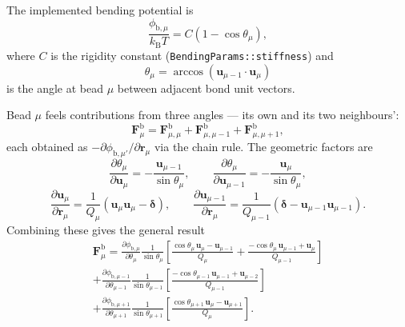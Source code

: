 \documentclass[11pt,a4paper]{report}
\newcommand{\uv}{\bm{u}}
\newcommand{\kB}{k_\mathrm{B}}
\newcommand{\code}[1]{\texttt{\seqsplitcode{#1}}}
\newcommand{\seqsplitcode}[1]{#1}
\begin{document}
The implemented bending potential is
\begin{equation}
  \frac{\phi_{\mathrm{b},\mu}}{\kB T} = C\left(1-\cos\theta_\mu\right),
  \label{eq:bending-potential}
\end{equation}
where $C$ is the rigidity constant (\code{BendingParams::stiffness}) and
\begin{equation}
  \theta_\mu = \arccos\left(\uv_{\mu-1}\cdot\uv_{\mu}\right)
\end{equation}
is the angle at bead $\mu$ between adjacent bond unit vectors.

Bead $\mu$ feels contributions from three angles --- its own and its two
neighbours':
\begin{equation}
  \bm{F}^{\mathrm{b}}_\mu
    = \bm{F}^{\mathrm{b}}_{\mu,\mu}
    + \bm{F}^{\mathrm{b}}_{\mu,\mu-1}
    + \bm{F}^{\mathrm{b}}_{\mu,\mu+1},
\end{equation}
each obtained as $-\partial\phi_{\mathrm{b},\mu'}/\partial\bm{r}_\mu$ via the
chain rule. The geometric factors are
\begin{equation}
  \frac{\partial\theta_\mu}{\partial\uv_\mu} = -\frac{\uv_{\mu-1}}{\sin\theta_\mu},
  \qquad
  \frac{\partial\theta_\mu}{\partial\uv_{\mu-1}} = -\frac{\uv_{\mu}}{\sin\theta_\mu},
\end{equation}
\begin{equation}
  \frac{\partial\uv_\mu}{\partial\bm{r}_\mu} = \frac{1}{Q_\mu}\left(\uv_\mu\uv_\mu-\bm{\delta}\right),
  \qquad
  \frac{\partial\uv_{\mu-1}}{\partial\bm{r}_\mu} = \frac{1}{Q_{\mu-1}}\left(\bm{\delta}-\uv_{\mu-1}\uv_{\mu-1}\right).
\end{equation}
Combining these gives the general result
\begin{multline}
  \bm{F}^{\mathrm{b}}_\mu =
   \frac{\partial\phi_{\mathrm{b},\mu}}{\partial\theta_\mu}\frac{1}{\sin\theta_\mu}
   \left[\frac{\cos\theta_\mu\,\uv_\mu-\uv_{\mu-1}}{Q_\mu}
       + \frac{-\cos\theta_\mu\,\uv_{\mu-1}+\uv_\mu}{Q_{\mu-1}}\right]\\
 + \frac{\partial\phi_{\mathrm{b},\mu-1}}{\partial\theta_{\mu-1}}\frac{1}{\sin\theta_{\mu-1}}
   \left[\frac{-\cos\theta_{\mu-1}\,\uv_{\mu-1}+\uv_{\mu-2}}{Q_{\mu-1}}\right]\\
 + \frac{\partial\phi_{\mathrm{b},\mu+1}}{\partial\theta_{\mu+1}}\frac{1}{\sin\theta_{\mu+1}}
   \left[\frac{\cos\theta_{\mu+1}\,\uv_\mu-\uv_{\mu+1}}{Q_\mu}\right].
\end{multline}
\end{document}
